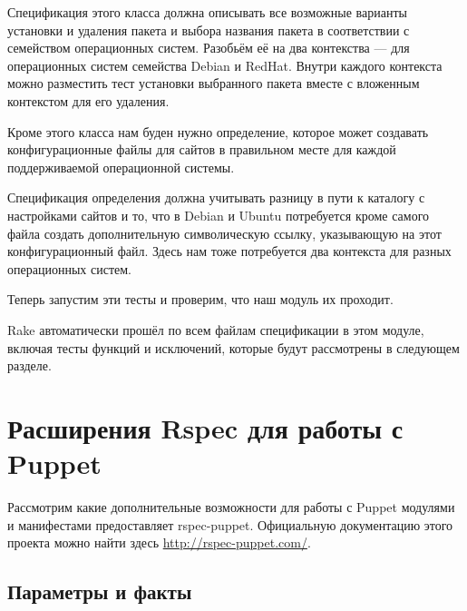

Спецификация этого класса должна описывать все возможные варианты установки и удаления пакета и выбора названия пакета в соответствии с семейством операционных систем. Разобьём её на два контекства --- для операционных систем семейства Debian и RedHat. Внутри каждого контекста можно разместить тест установки выбранного пакета вместе с вложенным контекстом для его удаления.



Кроме этого класса нам буден нужно определение, которое может создавать конфигурационные файлы для сайтов в правильном месте для каждой поддерживаемой операционной системы.



Спецификация определения должна учитывать разницу в пути к каталогу с настройками сайтов и то, что в Debian и Ubuntu потребуется кроме самого файла создать дополнительную символическую ссылку, указывающую на этот конфигурационный файл. Здесь нам тоже потребуется два контекста для разных операционных систем.



Теперь запустим эти тесты и проверим, что наш модуль их проходит.



Rake автоматически прошёл по всем файлам спецификации в этом модуле, включая тесты функций и исключений, которые будут рассмотрены в следующем разделе.


\section{Расширения Rspec для работы с Puppet}

Рассмотрим какие дополнительные возможности для работы с Puppet модулями и манифестами предоставляет rspec-puppet. Официальную документацию этого проекта можно найти здесь \url{http://rspec-puppet.com/}.

\subsection{Параметры и факты}

